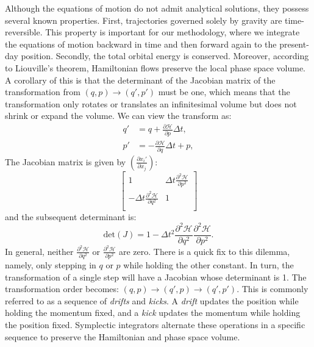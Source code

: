     Although the equations of motion do not admit analytical solutions, they possess several known properties. First, trajectories governed solely by gravity are time-reversible. This property is important for our methodology, where we integrate the equations of motion backward in time and then forward again to the present-day position. Secondly, the total orbital energy is conserved. Moreover, according to Liouville's theorem, Hamiltonian flows preserve the local phase space volume. A corollary of this is that the determinant of the Jacobian matrix of the transformation from $\left(q,p\right)\rightarrow \left(q',p'\right)$ must be one, which means that the transformation only rotates or translates an infinitesimal volume but does not shrink or expand the volume. We can view the transform as: 
    \begin{eqnarray}
        q' &= q + \frac{\partial \mathcal{H}}{\partial p}\Delta t, \\
        p' &= -\frac{\partial \mathcal{H}}{\partial q}\Delta t + p,
    \end{eqnarray}
    The Jacobian matrix is given by $\left(\frac{\partial x_i'}{\partial x_j }\right)$: 
    \begin{equation}
        \begin{bmatrix}
            1 & \Delta t \frac{\partial^2 \mathcal{H}}{\partial p^2} \\  
            -\Delta t \frac{\partial^2 \mathcal{H}}{\partial q^2} & 1 \\  
        \end{bmatrix}
    \end{equation}
    and the subsequent determinant is: 
    \begin{equation}
        \mathrm{det}\left(J\right) = 1 - \Delta t^2 \frac{\partial^2 \mathcal{H}}{\partial q^2} \frac{\partial^2 \mathcal{H}}{\partial p^2}.
    \end{equation}
    In general, neither $\frac{\partial^2 \mathcal{H}}{\partial q^2}$ or $\frac{\partial^2 \mathcal{H}}{\partial p^2}$ are zero. There is a quick fix to this dilemma, namely, only stepping in $q$ or $p$ while holding the other constant. In turn, the transformation of a single step will have a Jacobian whose determinant is 1. The transformation order becomes: $(q,p) \rightarrow (q',p) \rightarrow (q',p')$. This is commonly referred to as a sequence of \textit{drifts} and \textit{kicks}. A \textit{drift} updates the position while holding the momentum fixed, and a \textit{kick} updates the momentum while holding the position fixed. Symplectic integrators alternate these operations in a specific sequence to preserve the Hamiltonian and phase space volume.

